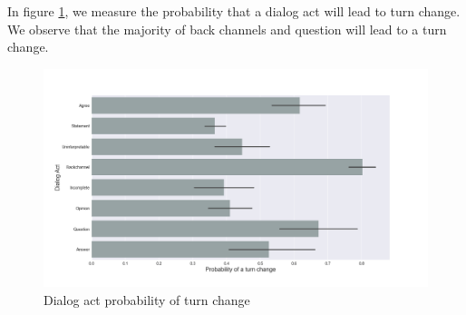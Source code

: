 In figure \ref{f2}, we measure the probability that a dialog act will lead to turn change. We observe that the majority of back channels and question will lead to a turn change.

\begin{figure}[ht!]
\centering
\includegraphics[width=\textwidth]{../scikitlearn/figures/f2.png}
\caption{Dialog act probability of turn change\label{overflow}}
\label{f2}
\end{figure}
\pagebreak 